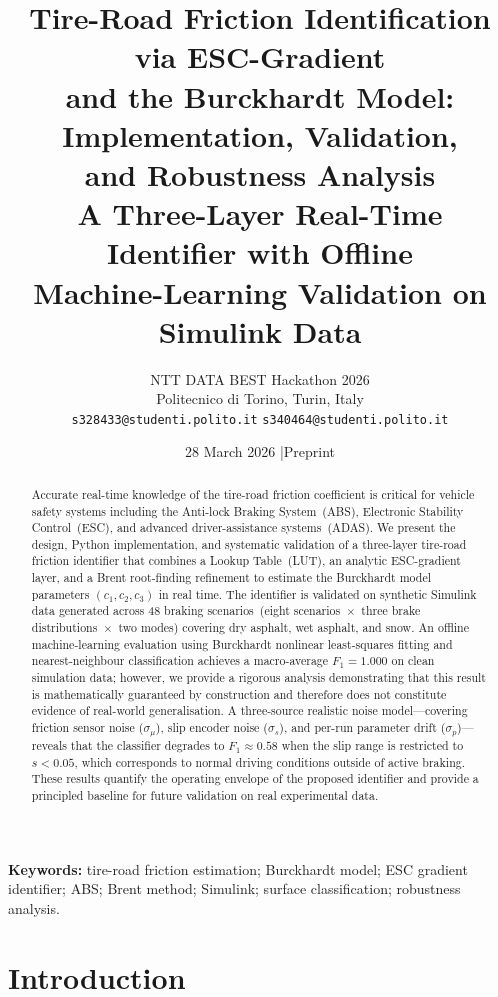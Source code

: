 \documentclass[11pt,a4paper]{article}
\title{%
  \textbf{Tire-Road Friction Identification via ESC-Gradient\\
  and the Burckhardt Model: Implementation, Validation,\\
  and Robustness Analysis}\\[0.8em]
  {\large A Three-Layer Real-Time Identifier with Offline\\
  Machine-Learning Validation on Simulink Data}
}
\author{%
  NTT DATA BEST Hackathon 2026\\
  Politecnico di Torino, Turin, Italy\\[0.3em]
  \texttt{s328433@studenti.polito.it} \quad
  \texttt{s340464@studenti.polito.it}
}
\date{28 March 2026 \quad|\quad Preprint}
\begin{document}

\maketitle

\begin{abstract}
Accurate real-time knowledge of the tire-road friction coefficient is critical
for vehicle safety systems including the Anti-lock Braking System~(ABS),
Electronic Stability Control~(ESC), and advanced driver-assistance systems~(ADAS).
We present the design, Python implementation, and systematic validation of a
three-layer tire-road friction identifier that combines a Lookup Table~(LUT),
an analytic ESC-gradient layer, and a Brent root-finding refinement to estimate
the Burckhardt model parameters $(c_1, c_2, c_3)$ in real time.
The identifier is validated on synthetic Simulink data generated across 48 braking
scenarios~(eight scenarios~$\times$~three brake distributions~$\times$~two modes)
covering dry asphalt, wet asphalt, and snow.
An offline machine-learning evaluation using Burckhardt nonlinear least-squares
fitting and nearest-neighbour classification achieves a macro-average
$F_1 = 1.000$ on clean simulation data;
however, we provide a rigorous analysis demonstrating that this result is
mathematically guaranteed by construction and therefore does not constitute
evidence of real-world generalisation.
A three-source realistic noise model---covering friction sensor noise
($\sigma_\mu$), slip encoder noise ($\sigma_s$), and per-run parameter drift
($\sigma_p$)---reveals that the classifier degrades to $F_1 \approx 0.58$ when
the slip range is restricted to $s < 0.05$, which corresponds to normal driving
conditions outside of active braking.
These results quantify the operating envelope of the proposed identifier and
provide a principled baseline for future validation on real experimental data.
\end{abstract}

\bigskip
\noindent\textbf{Keywords:} tire-road friction estimation; Burckhardt model; ESC gradient identifier; ABS; Brent method; Simulink; surface classification; robustness analysis.

\bigskip
\section{Introduction}
\label{sec:intro}
\end{document}
